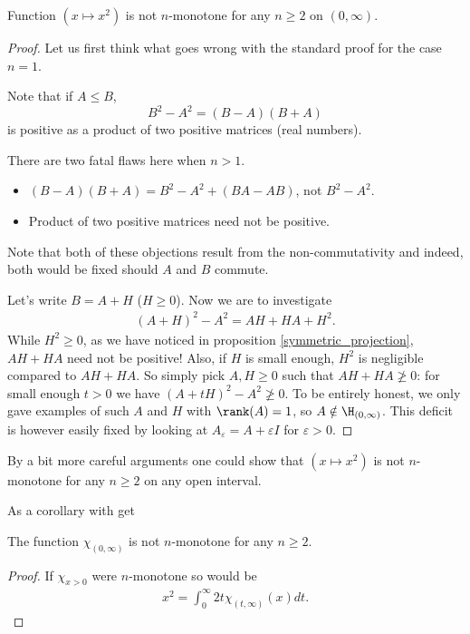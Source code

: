 \begin{prop}
	Function $(x \mapsto x^2)$ is not $n$-monotone for any $n \geq 2$ on $(0, \infty)$.
\end{prop}
\begin{proof}
	Let us first think what goes wrong with the standard proof for the case $n = 1$.

	Note that if $A \leq B$,
	\[
		B^2 - A^2 = (B - A) (B + A)
	\]
	is positive as a product of two positive matrices (real numbers).

	There are two fatal flaws here when $n > 1$.
	\begin{itemize}
		\item $(B - A) (B + A) = B^2-A^2 + (B A - A B)$, not $B^2 - A^2$.
		\item Product of two positive matrices need not be positive.
	\end{itemize}
	Note that both of these objections result from the non-commutativity and indeed, both would be fixed should $A$ and $B$ commute.

	Let's write $B = A + H$ ($H \geq 0$). Now we are to investigate
	\begin{align*}
		(A + H)^2-A^2 = A H + H A + H^2.
	\end{align*}
	While $H^2 \geq 0$, as we have noticed in proposition \ref{symmetric_projection}, $A H + H A$ need not be positive! Also, if $H$ is small enough, $H^2$ is negligible compared to $AH + HA$. So simply pick $A, H \geq 0$ such that $A H + H A \not\geq 0$: for small enough $t > 0$ we have $(A + t H)^2 - A^2 \not\geq 0$. To be entirely honest, we only gave examples of such $A$ and $H$ with $\rank(A) = 1$, so $A \notin \H_{(0, \infty)}$. This deficit is however easily fixed by looking at $A_{\varepsilon} = A + \varepsilon I$ for $\varepsilon > 0$.
\end{proof}

By a bit more careful arguments one could show that $(x \mapsto x^2)$ is not $n$-monotone for any $n \geq 2$ on any open interval.

As a corollary with get

\begin{kor}\label{chimon}
	The function $\chi_{(0, \infty)}$ is not $n$-monotone for any $n \geq 2$.
\end{kor}

\begin{proof}
	If $\chi_{x > 0}$ were $n$-monotone so would be
	\begin{align*}
		x^2 = \int_{0}^{\infty} 2 t \chi_{(t, \infty)}(x) dt.
	\end{align*}
\end{proof}

